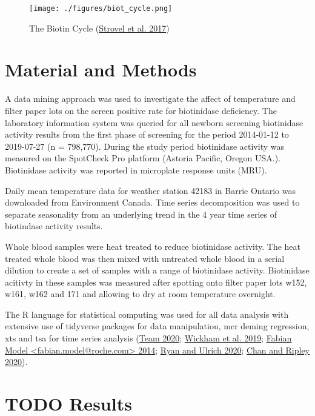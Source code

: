 \documentclass[review]{elsarticle}
\begin{document}
\begin{figure}[htbp]
\centering
\texttt{[image: ./figures/biot\_cycle.png]}
\caption{\label{fig:org969d190}The Biotin Cycle (\hyperlink{citeproc_bib_item_4}{Strovel et al. 2017})}
\end{figure}

\section*{Material and Methods}
\label{sec:org9eeeb96}
A data mining approach was used to investigate the affect of
temperature and filter paper lots on the screen positive rate for
biotinidase deficiency. The laboratory information system was queried
for all newborn screening biotinidase activity results from the first
phase of screening for the period 2014-01-12 to 2019-07-27 (n =
798,770). During the study period biotinidase activity was measured on
the SpotCheck Pro platform (Astoria Pacific, Oregon USA.). Biotinidase
activity was reported in microplate response units (MRU).

Daily mean temperature data for weather station 42183 in Barrie
Ontario was downloaded from Environment Canada. Time series
decomposition was used to separate seasonality from an underlying
trend in the 4 year time series of biotindase activity results.

Whole blood samples were heat treated to reduce biotinidase
activity. The heat treated whole blood was then mixed with untreated
whole blood in a serial dilution to create a set of samples with a
range of biotinidase activity. Biotinidase acitivty in these samples
was measured after spotting onto filter paper lots w152, w161, w162
and 171 and allowing to dry at room temperature overnight.

The R language for statistical computing was used for all data
analysis with extensive use of tidyverse packages for data
manipulation, mcr deming regression, xts and tsa for time series
analysis (\hyperlink{citeproc_bib_item_5}{Team 2020}; \hyperlink{citeproc_bib_item_6}{Wickham et al. 2019}; \hyperlink{citeproc_bib_item_2}{Fabian Model <fabian.model@roche.com> 2014}; \hyperlink{citeproc_bib_item_3}{Ryan and Ulrich 2020}; \hyperlink{citeproc_bib_item_1}{Chan and Ripley 2020}).

\section*{{\bfseries\sffamily TODO} Results}
\label{sec:org37d2752}
\end{document}
